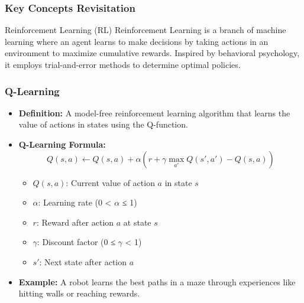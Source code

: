 \documentclass[aspectratio=169]{beamer}
\begin{document}
\begin{frame}[fragile]
    \frametitle{Key Concepts Revisitation}
    \begin{block}{Reinforcement Learning (RL)}
        Reinforcement Learning is a branch of machine learning where an agent learns to make decisions by taking actions in an environment to maximize cumulative rewards. Inspired by behavioral psychology, it employs trial-and-error methods to determine optimal policies.
    \end{block}
\end{frame}

\begin{frame}[fragile]
    \frametitle{Q-Learning}
    \begin{itemize}
        \item \textbf{Definition:} A model-free reinforcement learning algorithm that learns the value of actions in states using the Q-function.
        \item \textbf{Q-Learning Formula:}
        \begin{equation}
            Q(s, a) \leftarrow Q(s, a) + \alpha \left( r + \gamma \max_{a'} Q(s', a') - Q(s, a) \right)
        \end{equation}
        \begin{itemize}
            \item $Q(s, a)$: Current value of action $a$ in state $s$
            \item $\alpha$: Learning rate (0 < $\alpha$ ≤ 1)
            \item $r$: Reward after action $a$ at state $s$
            \item $\gamma$: Discount factor (0 ≤ $\gamma$ < 1)
            \item $s'$: Next state after action $a$
        \end{itemize}
        \item \textbf{Example:} A robot learns the best paths in a maze through experiences like hitting walls or reaching rewards.
    \end{itemize}
\end{frame}
\end{document}
